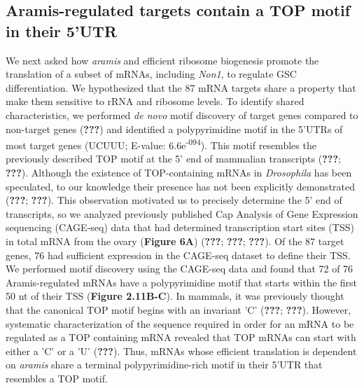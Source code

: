 \documentclass[12pt,oneside]{reedthesis}
\begin{document}
\hypertarget{aramis-regulated-targets-contain-a-top-motif-in-their-5utr}{%
\subsection{Aramis-regulated targets contain a TOP motif in their 5'UTR}\label{aramis-regulated-targets-contain-a-top-motif-in-their-5utr}}

We next asked how \emph{aramis} and efficient ribosome biogenesis promote the translation of a subset of mRNAs, including \emph{Non1}, to regulate GSC differentiation. We hypothesized that the 87 mRNA targets share a property that make them sensitive to rRNA and ribosome levels. To identify shared characteristics, we performed \emph{de novo} motif discovery of target genes compared to non-target genes ({\textbf{???}}) and identified a polypyrimidine motif in the 5'UTRs of most target genes (UCUUU; E-value: 6.6e\textsuperscript{-094}). This motif resembles the previously described TOP motif at the 5' end of mammalian transcripts ({\textbf{???}}; {\textbf{???}}). Although the existence of TOP-containing mRNAs in \emph{Drosophila} has been speculated, to our knowledge their presence has not been explicitly demonstrated ({\textbf{???}}; {\textbf{???}}). This observation motivated us to precisely determine the 5' end of transcripts, so we analyzed previously published Cap Analysis of Gene Expression sequencing (CAGE-seq) data that had determined transcription start sites (TSS) in total mRNA from the ovary (\textbf{Figure 6A}) ({\textbf{???}}; {\textbf{???}}; {\textbf{???}}). Of the 87 target genes, 76 had sufficient expression in the CAGE-seq dataset to define their TSS. We performed motif discovery using the CAGE-seq data and found that 72 of 76 Aramis-regulated mRNAs have a polypyrimidine motif that starts within the first 50 nt of their TSS (\textbf{Figure 2.11B-C}). In mammals, it was previously thought that the canonical TOP motif begins with an invariant 'C' ({\textbf{???}}; {\textbf{???}}). However, systematic characterization of the sequence required in order for an mRNA to be regulated as a TOP containing mRNA revealed that TOP mRNAs can start with either a 'C' or a 'U' ({\textbf{???}}). Thus, mRNAs whose efficient translation is dependent on \emph{aramis} share a terminal polypyrimidine-rich motif in their 5'UTR that resembles a TOP motif.
\end{document}
